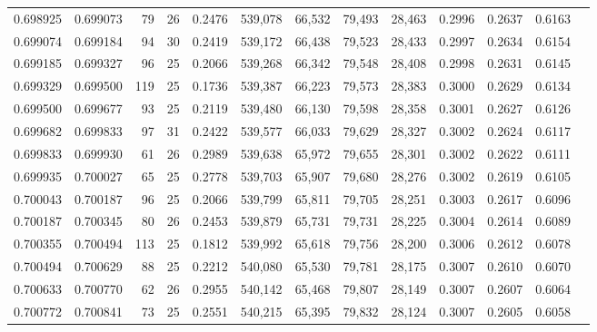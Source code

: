 \begin{tabular}{rrrrrrrrrrrrr}
0.698925 & 0.699073 &    79 &  26 &                                     0.2476 & 539,078 &  66,532 &  79,493 &  28,463 & 0.2996 & 0.2637 & 0.6163 \\
0.699074 & 0.699184 &    94 &  30 &                                     0.2419 & 539,172 &  66,438 &  79,523 &  28,433 & 0.2997 & 0.2634 & 0.6154 \\
0.699185 & 0.699327 &    96 &  25 &                                     0.2066 & 539,268 &  66,342 &  79,548 &  28,408 & 0.2998 & 0.2631 & 0.6145 \\
0.699329 & 0.699500 &   119 &  25 &                                     0.1736 & 539,387 &  66,223 &  79,573 &  28,383 & 0.3000 & 0.2629 & 0.6134 \\
0.699500 & 0.699677 &    93 &  25 &                                     0.2119 & 539,480 &  66,130 &  79,598 &  28,358 & 0.3001 & 0.2627 & 0.6126 \\
0.699682 & 0.699833 &    97 &  31 &                                     0.2422 & 539,577 &  66,033 &  79,629 &  28,327 & 0.3002 & 0.2624 & 0.6117 \\
0.699833 & 0.699930 &    61 &  26 &                                     0.2989 & 539,638 &  65,972 &  79,655 &  28,301 & 0.3002 & 0.2622 & 0.6111 \\
0.699935 & 0.700027 &    65 &  25 &                                     0.2778 & 539,703 &  65,907 &  79,680 &  28,276 & 0.3002 & 0.2619 & 0.6105 \\
0.700043 & 0.700187 &    96 &  25 &                                     0.2066 & 539,799 &  65,811 &  79,705 &  28,251 & 0.3003 & 0.2617 & 0.6096 \\
0.700187 & 0.700345 &    80 &  26 &                                     0.2453 & 539,879 &  65,731 &  79,731 &  28,225 & 0.3004 & 0.2614 & 0.6089 \\
0.700355 & 0.700494 &   113 &  25 &                                     0.1812 & 539,992 &  65,618 &  79,756 &  28,200 & 0.3006 & 0.2612 & 0.6078 \\
0.700494 & 0.700629 &    88 &  25 &                                     0.2212 & 540,080 &  65,530 &  79,781 &  28,175 & 0.3007 & 0.2610 & 0.6070 \\
0.700633 & 0.700770 &    62 &  26 &                                     0.2955 & 540,142 &  65,468 &  79,807 &  28,149 & 0.3007 & 0.2607 & 0.6064 \\
0.700772 & 0.700841 &    73 &  25 &                                     0.2551 & 540,215 &  65,395 &  79,832 &  28,124 & 0.3007 & 0.2605 & 0.6058 \\

\end{tabular}
